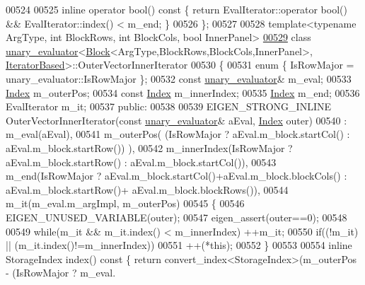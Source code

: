 \begin{DoxyCode}
00524 
00525   \textcolor{keyword}{inline} \textcolor{keyword}{operator} bool()\textcolor{keyword}{ const }\{ \textcolor{keywordflow}{return} EvalIterator::operator bool() && EvalIterator::index() < m\_end; \}
00526 \};
00527 
00528 \textcolor{keyword}{template}<\textcolor{keyword}{typename} ArgType, \textcolor{keywordtype}{int} BlockRows, \textcolor{keywordtype}{int} BlockCols, \textcolor{keywordtype}{bool} InnerPanel>
\hyperlink{class_eigen_1_1internal_1_1unary__evaluator_3_01_block_3_01_arg_type_00_01_block_rows_00_01_bloc652d26bcece9990189dc15f4df1c964f}{00529} \textcolor{keyword}{class }\hyperlink{struct_eigen_1_1internal_1_1unary__evaluator}{unary\_evaluator}<\hyperlink{group___core___module_class_eigen_1_1_block}{Block}<ArgType,BlockRows,BlockCols,InnerPanel>, 
      \hyperlink{struct_eigen_1_1internal_1_1_iterator_based}{IteratorBased}>::OuterVectorInnerIterator
00530 \{
00531   \textcolor{keyword}{enum} \{ IsRowMajor = unary\_evaluator::IsRowMajor \};
00532   \textcolor{keyword}{const} \hyperlink{struct_eigen_1_1internal_1_1unary__evaluator}{unary\_evaluator}& m\_eval;
00533   \hyperlink{namespace_eigen_a62e77e0933482dafde8fe197d9a2cfde}{Index} m\_outerPos;
00534   \textcolor{keyword}{const} \hyperlink{namespace_eigen_a62e77e0933482dafde8fe197d9a2cfde}{Index} m\_innerIndex;
00535   \hyperlink{namespace_eigen_a62e77e0933482dafde8fe197d9a2cfde}{Index} m\_end;
00536   EvalIterator m\_it;
00537 \textcolor{keyword}{public}:
00538 
00539   EIGEN\_STRONG\_INLINE OuterVectorInnerIterator(\textcolor{keyword}{const} \hyperlink{struct_eigen_1_1internal_1_1unary__evaluator}{unary\_evaluator}& aEval, 
      \hyperlink{namespace_eigen_a62e77e0933482dafde8fe197d9a2cfde}{Index} outer)
00540     : m\_eval(aEval),
00541       m\_outerPos( (IsRowMajor ? aEval.m\_block.startCol() : aEval.m\_block.startRow()) ),
00542       m\_innerIndex(IsRowMajor ? aEval.m\_block.startRow() : aEval.m\_block.startCol()),
00543       m\_end(IsRowMajor ? aEval.m\_block.startCol()+aEval.m\_block.blockCols() : aEval.m\_block.startRow()+
      aEval.m\_block.blockRows()),
00544       m\_it(m\_eval.m\_argImpl, m\_outerPos)
00545   \{
00546     EIGEN\_UNUSED\_VARIABLE(outer);
00547     eigen\_assert(outer==0);
00548 
00549     \textcolor{keywordflow}{while}(m\_it && m\_it.index() < m\_innerIndex) ++m\_it;
00550     \textcolor{keywordflow}{if}((!m\_it) || (m\_it.index()!=m\_innerIndex))
00551       ++(*this);
00552   \}
00553 
00554   \textcolor{keyword}{inline} StorageIndex index()\textcolor{keyword}{ const }\{ \textcolor{keywordflow}{return} convert\_index<StorageIndex>(m\_outerPos - (IsRowMajor ? m\_eval.

\end{DoxyCode}
